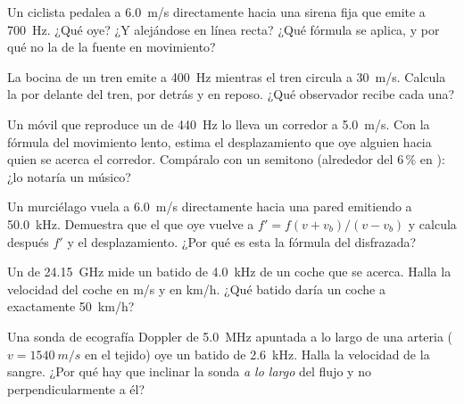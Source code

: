 \begin{exercise}[$\star$]\label{exo:g12:doppler-effect:3}
Un ciclista pedalea a \qty{6.0}{m/s} directamente hacia una sirena fija
que emite a \qty{700}{Hz}. ¿Qué  oye? ¿Y alejándose en línea
recta? ¿Qué fórmula se aplica, y por qué no la de la fuente en
movimiento?
\end{exercise}

\begin{exercise}[$\star$]\label{exo:g12:doppler-effect:4}
La bocina de un tren emite a \qty{400}{Hz} mientras el tren circula a
\qty{30}{m/s}. Calcula la  por delante del tren, por
detrás y en reposo. ¿Qué observador recibe cada una?
\end{exercise}

\begin{exercise}[$\star$]\label{exo:g12:doppler-effect:5}
Un móvil que reproduce un  de \qty{440}{Hz} lo lleva un corredor a
\qty{5.0}{m/s}. Con la fórmula del movimiento lento, estima el
desplazamiento que oye alguien hacia quien se acerca el corredor.
Compáralo con un semitono (alrededor del $6\,\%$ en ): ¿lo
notaría un músico?
\end{exercise}

\begin{exercise}[$\star\star$]\label{exo:g12:doppler-effect:6}
Un murciélago vuela a \qty{6.0}{m/s} directamente hacia una pared
emitiendo a \qty{50.0}{kHz}. Demuestra que el  que oye vuelve a
$f' = f(v + v_b)/(v - v_b)$ y calcula después $f'$ y el desplazamiento.
¿Por qué es esta la fórmula del  disfrazada?
\end{exercise}

\begin{exercise}[$\star\star$]\label{exo:g12:doppler-effect:7}
Un  de \qty{24.15}{GHz} mide un batido de \qty{4.0}{kHz} de un
coche que se acerca. Halla la velocidad del coche en \unit{m/s} y en
\unit{km/h}. ¿Qué batido daría un coche a exactamente \qty{50}{km/h}?
\end{exercise}

\begin{exercise}[$\star\star$]\label{exo:g12:doppler-effect:8}
Una sonda de ecografía Doppler de \qty{5.0}{MHz} apuntada a lo largo de
una arteria ($v = \qty{1540}{m/s}$ en el tejido) oye un batido de
\qty{2.6}{kHz}. Halla la velocidad de la sangre. ¿Por qué hay que
inclinar la sonda \emph{a lo largo} del flujo y no perpendicularmente a
él?
\end{exercise}


